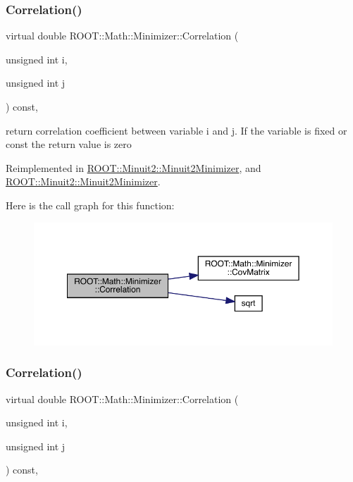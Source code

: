 \subsubsection{\texorpdfstring{Correlation()}{Correlation()}\hspace{0.1cm}{\footnotesize\ttfamily [1/2]}}
{\footnotesize\ttfamily virtual double R\+O\+O\+T\+::\+Math\+::\+Minimizer\+::\+Correlation (\begin{DoxyParamCaption}\item[{unsigned int}]{i,  }\item[{unsigned int}]{j }\end{DoxyParamCaption}) const\hspace{0.3cm}{\ttfamily [inline]}, {\ttfamily [virtual]}}

return correlation coefficient between variable i and j. If the variable is fixed or const the return value is zero 

Reimplemented in \mbox{\hyperlink{classROOT_1_1Minuit2_1_1Minuit2Minimizer_a229e82025189e72b5a03cb4e3be19f4a}{R\+O\+O\+T\+::\+Minuit2\+::\+Minuit2\+Minimizer}}, and \mbox{\hyperlink{classROOT_1_1Minuit2_1_1Minuit2Minimizer_a229e82025189e72b5a03cb4e3be19f4a}{R\+O\+O\+T\+::\+Minuit2\+::\+Minuit2\+Minimizer}}.

Here is the call graph for this function\+:
\nopagebreak
\begin{figure}[H]
\begin{center}
\leavevmode
\includegraphics[width=350pt]{dc/dc4/classROOT_1_1Math_1_1Minimizer_a9ba2f4bc3c8c0e905f2c018e79809c0e_cgraph}
\end{center}
\end{figure}
\mbox{\label{classROOT_1_1Math_1_1Minimizer_a9ba2f4bc3c8c0e905f2c018e79809c0e}} 
\subsubsection{\texorpdfstring{Correlation()}{Correlation()}\hspace{0.1cm}{\footnotesize\ttfamily [2/2]}}
{\footnotesize\ttfamily virtual double R\+O\+O\+T\+::\+Math\+::\+Minimizer\+::\+Correlation (\begin{DoxyParamCaption}\item[{unsigned int}]{i,  }\item[{unsigned int}]{j }\end{DoxyParamCaption}) const\hspace{0.3cm}{\ttfamily [inline]}, {\ttfamily [virtual]}}

